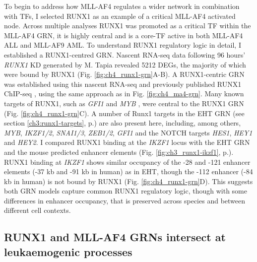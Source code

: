 To begin to address how MLL-AF4 regulates a wider network in combination with TFs, I selected RUNX1 as an example of a critical MLL-AF4 activated node. Across multiple analyses RUNX1 was promoted as a critical TF within the MLL-AF4 GRN, it is highly central and is a core-TF active in both MLL-AF4 ALL and MLL-AF9 AML. To understand RUNX1 regulatory logic in detail, I established a RUNX1-centred GRN. Nascent RNA-seq data following 96 hours' \textit{RUNX1} KD generated by M. Tapia revealed 5212 DEGs, the majority of which were bound by RUNX1 (Fig. \ref{fig:ch4_runx1-grn}A-B). A RUNX1-centric GRN was established using this nascent RNA-seq and previously published RUNX1 ChIP-seq \citep{wilkinson_runx1_2013}, using the same approach as in Fig. \ref{fig:ch4_ma4-grn}. Many known targets of RUNX1, such as \textit{GFI1} \citep{wilson_gfi1_2010} and \textit{MYB} \citep{choi_runx1_2017}, were central to the RUNX1 GRN (Fig. \ref{fig:ch4_runx1-grn}C). A number of Runx1 targets in the EHT GRN (see section \ref{ch3:runx1-targets}, p.\pageref{ch3:runx1-targets}) are also present here, including, among others, \textit{MYB}, \textit{IKZF1/2}, \textit{SNAI1/3}, \textit{ZEB1/2}, \textit{GFI1} and the NOTCH targets \textit{HES1}, \textit{HEY1} and \textit{HEY2}. I compared RUNX1 binding at the \textit{IKZF1} locus with the EHT GRN and the mouse predicted enhancer elements (Fig. \ref{fig:ch3_runx1-ikzf1}, p.\pageref{fig:ch3_runx1-ikzf1}). RUNX1 binding at \textit{IKZF1} shows similar occupancy of the -28 and -121 enhancer elements (-37 kb and -91 kb in human) as in EHT, though the -112 enhancer (-84 kb in human) is not bound by RUNX1 (Fig. \ref{fig:ch4_runx1-grn}D). This suggests both GRN models capture common RUNX1 regulatory logic, though with some differences in enhancer occupancy, that is preserved across species and between different cell contexts.

\subsection[RUNX1 and MLL-AF4 GRNs intersect at leukaemogenic processes]{RUNX1 and MLL-AF4 GRNs intersect at\\leukaemogenic processes}

